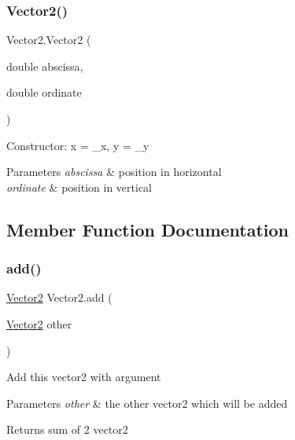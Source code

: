 \subsubsection{\texorpdfstring{Vector2()}{Vector2()}\hspace{0.1cm}{\footnotesize\ttfamily [2/2]}}
{\footnotesize\ttfamily Vector2.\+Vector2 (\begin{DoxyParamCaption}\item[{double}]{abscissa,  }\item[{double}]{ordinate }\end{DoxyParamCaption})\hspace{0.3cm}{\ttfamily [inline]}}

Constructor\+: x = \+\_\+x, y = \+\_\+y 
\begin{DoxyParams}{Parameters}
{\em abscissa} & position in horizontal \\
\hline
{\em ordinate} & position in vertical \\
\hline
\end{DoxyParams}


\subsection{Member Function Documentation}
\mbox{\label{class_vector2_a68ca937db25cb8a4211583a8b9dfdc1a}} 
\subsubsection{\texorpdfstring{add()}{add()}}
{\footnotesize\ttfamily \mbox{\hyperlink{class_vector2}{Vector2}} Vector2.\+add (\begin{DoxyParamCaption}\item[{\mbox{\hyperlink{class_vector2}{Vector2}}}]{other }\end{DoxyParamCaption})\hspace{0.3cm}{\ttfamily [inline]}}

Add this vector2 with argument 
\begin{DoxyParams}{Parameters}
{\em other} & the other vector2 which will be added \\
\hline
\end{DoxyParams}
\begin{DoxyReturn}{Returns}
sum of 2 vector2 
\end{DoxyReturn}
\mbox{\label{class_vector2_a7eb73e809bf6fb6b32c0de8352b707c3}} 
